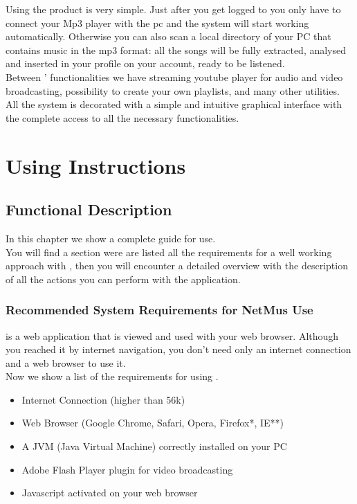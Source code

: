 Using the product is very simple. Just after you get logged to  you
only have to connect your Mp3 player with the pc and the system will start
working automatically. Otherwise you can also scan a local directory of your PC
that contains music in the mp3 format: all the songs will be fully extracted,
analysed and inserted in your profile on your  account, ready to be
listened.\\

Between ' functionalities we have streaming youtube player for audio
and video broadcasting, possibility to create your own playlists, and many other
utilities.\\

All the system is decorated with a simple and intuitive graphical interface
with the complete access to all the necessary functionalities.\\

\chapter{Using Instructions}
\thispagestyle{fancy}

\section{Functional Description}
In this chapter we show a complete guide for  use.\\
You will find a section were are listed all the requirements for a well
working approach with , then you will encounter a detailed overview
with the description of all the actions you can perform with the
application.

\subsection{Recommended System Requirements for NetMus Use}
 is a web application that is viewed and used with your web browser.
Although you reached it by internet navigation, you don't need only an internet
connection and a web browser to use it.\\

Now we show a list of the requirements for using .

\begin{itemize}
  \item Internet Connection (higher than 56k)
  \item Web Browser (Google Chrome, Safari, Opera, Firefox*, IE**)
  \item A JVM (Java Virtual Machine) correctly installed on your PC
  \item Adobe Flash Player plugin for video broadcasting
  \item Javascript activated on your web browser
\end{itemize}


